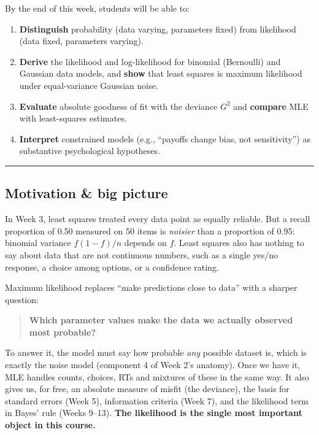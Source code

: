 By the end of this week, students will be able to:

\begin{enumerate}
\def\labelenumi{\arabic{enumi}.}
\tightlist
\item
  \textbf{Distinguish} probability (data varying, parameters fixed) from
  likelihood (data fixed, parameters varying).
\item
  \textbf{Derive} the likelihood and log-likelihood for binomial
  (Bernoulli) and Gaussian data models, and \textbf{show} that least
  squares is maximum likelihood under equal-variance Gaussian noise.
\item
  \textbf{Evaluate} absolute goodness of fit with the deviance \(G^2\)
  and \textbf{compare} MLE with least-squares estimates.
\item
  \textbf{Interpret} constrained models (e.g., ``payoffs change bias,
  not sensitivity'') as substantive psychological hypotheses.
\end{enumerate}

\begin{center}\rule{0.5\linewidth}{0.5pt}\end{center}

\subsection{Motivation \& big picture}

In Week 3, least squares treated every data point as equally reliable.
But a recall proportion of 0.50 measured on 50 items is \emph{noisier}
than a proportion of 0.95: binomial variance \(f(1-f)/n\) depends on
\(f\). Least squares also has nothing to say about data that are not
continuous numbers, such as a single yes/no response, a choice among
options, or a confidence rating.

Maximum likelihood replaces ``make predictions close to data'' with a
sharper question:

\begin{quote}
\textbf{Which parameter values make the data we actually observed most
probable?}
\end{quote}

To answer it, the model must say how probable \emph{any} possible
dataset is, which is exactly the noise model (component 4 of Week 2's
anatomy). Once we have it, MLE handles counts, choices, RTs and mixtures
of these in the same way. It also gives us, for free, an absolute
measure of misfit (the deviance), the basis for standard errors (Week
5), information criteria (Week 7), and the likelihood term in Bayes'
rule (Weeks 9--13). \textbf{The likelihood is the single most important
object in this course.}

